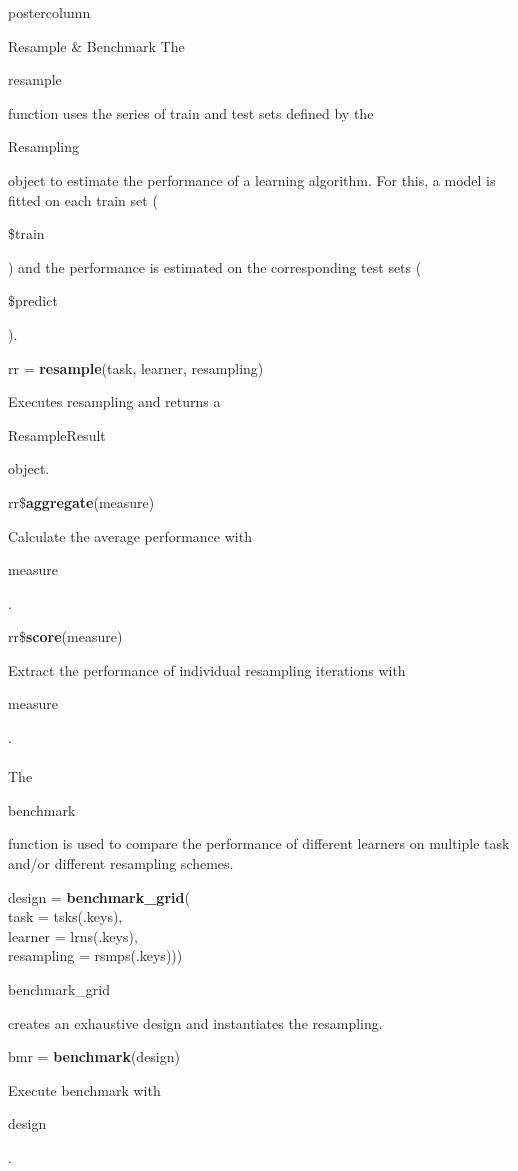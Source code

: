 \documentclass{beamer}
\newlength{\columnheight} %
\newcommand{\codeinline}[1]{\begin{codeboxinline}#1\end{codeboxinline}}
\begin{document}
\begin{frame}[fragile]{}
\begin{columns}
\begin{column}{.245\textwidth}
			\begin{beamercolorbox}[center]{postercolumn}
				\begin{minipage}{.98\textwidth}
					\parbox[t][\columnheight]{\textwidth}{
						\begin{myblock}{Resample \& Benchmark}
							The \codeinline{resample} function uses the series of train and test sets defined by the \codeinline{Resampling} object to estimate the performance of a learning algorithm. For this, a model is fitted on each train set (\codeinline{\$train}) and the performance is estimated on the corresponding test sets (\codeinline{\$predict}).
							\\
							\begin{codebox}
								rr = \textbf{resample}(task, learner, resampling)
							\end{codebox}
							Executes resampling and returns a \codeinline{ResampleResult} object.
							\\
							\begin{codebox}
								rr\$\textbf{aggregate}(measure)
							\end{codebox}
							Calculate the average performance with \codeinline{measure}.
							\\
							\begin{codebox}
								rr\$\textbf{score}(measure)
							\end{codebox}
							Extract the performance of individual resampling iterations with \codeinline{measure}.
							\\
							\\
							The \codeinline{benchmark} function is used to compare the performance of different learners on multiple task and/or different resampling schemes.
							\\
							\begin{codeboxmultiline}[width=21.95cm]
								design = \textbf{benchmark\_grid}(\\
								\hspace*{1ex}task = tsks(.keys),\\
								\hspace*{1ex}learner = lrns(.keys),\\
								\hspace*{1ex}resampling = rsmps(.keys)))
							\end{codeboxmultiline}
							\codeinline{benchmark\_grid} creates an exhaustive design and instantiates the resampling.
							\\
							\begin{codebox}
								bmr = \textbf{benchmark}(design)
							\end{codebox}
							Execute benchmark with \codeinline{design}. \\
							

\end{myblock}}
\end{minipage}
\end{beamercolorbox}
\end{column}
\end{columns}
\end{frame}
\end{document}
